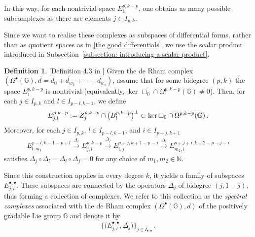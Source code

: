 \documentclass[dvipsnames]{amsart}
\theoremstyle{definition}
\newtheorem{definition}[theorem]{Definition}
\theoremstyle{definition}
\numberwithin{equation}{section}
\newcommand{\N}{\mathbb{N}}
\newcommand{\G}{\mathbb{G}}
\begin{document}
In this way, for each nontrivial space $E_1^{p,k-p}$, one obtains as many possible subcomplexes as there are elements $j\in I_{p,k}$.

Since we want to realise these complexes as subspaces of differential forms, rather than as quotient spaces as in \eqref{the good differentials}, we use the scalar product introduced in Subsection~\ref{subsection: introducing a scalar product}.


    
    \begin{definition}\label{def: spectral complexes}[Definition 4.3 in \cite{tripaldi2026spectralcomplexestruncatedmulticomplexes}]
        Given the de Rham complex $(\Omega^\bullet(\mathbb{G}), d = d_0 + d_{w_1} + \cdots + d_{w_s})$, assume that for some bidegree $(p,k)$ the space $E_1^{p,k-p}$ is nontrivial (equivalently, $\ker \Box_0 \cap \Omega^{p,k-p}(\mathbb{G}) \neq 0$).
        Then, for each $j \in I_{p,k}$ and $l \in I_{p-l,k-1}$, we define
        \begin{align}\label{eq: def E_{j,l}}
            E_{j,l}^{p,k-p}:=Z_j^{p,k-p}\cap\big(B_l^{p,k-p}\big)^\perp\subset \ker\Box_0\cap\Omega^{p,k-p}(\G)\,.
        \end{align}
        Moreover, for each $j\in I_{p,k}$, $l\in I_{p-l,k-1}$, and $i\in I_{p+j,k+1}$
        \begin{align*}
            E_{l,m_1}^{p-l,k-1-p+l}\xrightarrow[]{\Delta_l} E_{j,l}^{p,k-p}\xrightarrow[]{\Delta_j}E_{i,j}^{p+j,k+1-p-j}\xrightarrow[]{\Delta_i}E_{m_2,i}^{p+j+i,k+2-p-j-i}
        \end{align*}
        satisfies $\Delta_j\circ \Delta_l=\Delta_i\circ\Delta_j=0$ for any choice of $m_1,m_2\in\N$.

        Since this construction applies in every degree $k$, it yields a family of subspaces $E_{j,l}^{\bullet,\bullet}$. These subspaces are connected by the operators $\Delta_j$ of bidegree $(j,1-j)$, thus forming a collection of complexes. We refer to this collection as the \textit{spectral complexes} associated with the de Rham complex $(\Omega^\bullet(\G),d)$ of the positively gradable Lie group $\G$ and denote it by 
        \begin{align*}
            \big\{\big(E_{j,l}^{\bullet,\bullet},\Delta_j\big)\big\}_{j\in I_{\bullet,\bullet}}\,.
        \end{align*}
    \end{definition}
\end{document}
